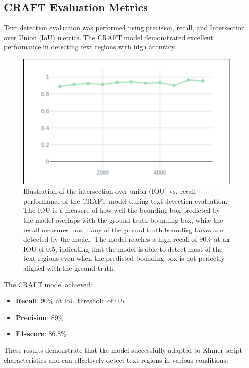 \subsection{CRAFT Evaluation Metrics}
\label{subsec:craft-evaluation}

Text detection evaluation was performed using precision, recall, and Intersection over Union (IoU) metrics. The CRAFT model demonstrated excellent performance in detecting text regions with high accuracy.

\begin{figure}[H]
    \centering
    \includegraphics[width=\textwidth]{figures/iou_craft.png}
    \caption{Illustration of the intersection over union (IOU) vs. recall performance of the CRAFT model 
    during text detection evaluation. The IOU is a measure of how well the bounding box predicted 
    by the model overlaps with the ground truth bounding box, while the recall measures how many of 
    the ground truth bounding boxes are detected by the model. The model reaches a high recall of 
    90\% at an IOU of 0.5, indicating that the model is able to detect most of the text regions even 
    when the predicted bounding box is not perfectly aligned with the ground truth.}
    \label{fig:iou-recall-craft}
\end{figure}

The CRAFT model achieved:
\begin{itemize}
\item \textbf{Recall}: 90\% at IoU threshold of 0.5
\item \textbf{Precision}: 89\% 
\item \textbf{F1-score}: 86.8\%
\end{itemize}

These results demonstrate that the model successfully adapted to Khmer script characteristics and can effectively detect text regions in various conditions.

